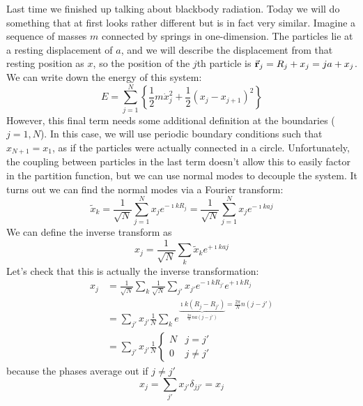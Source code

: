 \documentclass[a4paper,twoside,master.tex]{subfiles}
\begin{document}

Last time we finished up talking about blackbody radiation. Today we will do something that at first looks rather different but is in fact very similar. Imagine a sequence of masses $ m $ connected by springs in one-dimension. The particles lie at a resting displacement of $ a $, and we will describe the displacement from that resting position as $ x $, so the position of the $ j $th particle is $ \va{r}_j = R_j + x_j = ja + x_j $. We can write down the energy of this system:
\begin{equation}
    E = \sum_{j=1}^{N} \left\{ \frac{1}{2} m\dot{x}_j^2 + \frac{1}{2} \left( x_j - x_{j+1} \right)^2 \right\}
\end{equation}
However, this final term needs some additional definition at the boundaries ($ j = 1,N $). In this case, we will use periodic boundary conditions such that $ x_{N+1} = x_1 $, as if the particles were actually connected in a circle. Unfortunately, the coupling between particles in the last term doesn't allow this to easily factor in the partition function, but we can use normal modes to decouple the system. It turns out we can find the normal modes via a Fourier transform:
\begin{equation}
    \tilde{x}_k = \frac{1}{\sqrt{N}} \sum_{j=1}^{N} x_j e^{- \imath k R_j} = \frac{1}{\sqrt{N}} \sum_{j=1}^{N} x_j e^{- \imath k a j}
\end{equation}
We can define the inverse transform as
\begin{equation}
    x_j = \frac{1}{\sqrt{N}} \sum_k \tilde{x}_k e^{+ \imath k a j}
\end{equation}
Let's check that this is actually the inverse transformation:
\begin{align}
    x_j &= \frac{1}{\sqrt{N}} \sum_k \frac{1}{\sqrt{N}} \sum_{j'} x_{j'} e^{- \imath k R_{j'}} e^{+ \imath k R_{j}} \\
    &= \sum_{j'} x_{j'} \frac{1}{N} \sum_{k} e^{\underbrace{\imath k (R_j - R_{j'})}_{\frac{2 \pi}{L} n a (j-j')} = \frac{2 \pi}{N} n (j-j')} \\
    &= \sum_{j'} x_{j'} \frac{1}{N} \begin{cases} N & j = j'\\ 0 & j \neq j' \end{cases}
\end{align}
because the phases average out if $ j \neq j' $
\begin{equation}
    x_j = \sum_{j'} x_{j'} \delta_{jj'} = x_j
\end{equation}
\end{document}
